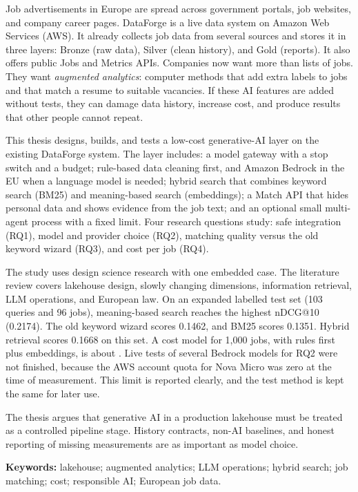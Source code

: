 Job advertisements in Europe are spread across government portals, job websites, and company career pages. DataForge is a live data system on Amazon Web Services (AWS). It already collects job data from several sources and stores it in three layers: Bronze (raw data), Silver (clean history), and Gold (reports). It also offers public Jobs and Metrics APIs. Companies now want more than lists of jobs. They want \emph{augmented analytics}: computer methods that add extra labels to jobs and that match a resume to suitable vacancies. If these AI features are added without tests, they can damage data history, increase cost, and produce results that other people cannot repeat.

This thesis designs, builds, and tests a low-cost generative-AI layer on the existing DataForge system. The layer includes: a model gateway with a stop switch and a budget; rule-based data cleaning first, and Amazon Bedrock in the EU when a language model is needed; hybrid search that combines keyword search (BM25) and meaning-based search (embeddings); a Match API that hides personal data and shows evidence from the job text; and an optional small multi-agent process with a fixed limit. Four research questions study: safe integration (RQ1), model and provider choice (RQ2), matching quality versus the old keyword wizard (RQ3), and cost per job (RQ4).

The study uses design science research with one embedded case. The literature review covers lakehouse design, slowly changing dimensions, information retrieval, LLM operations, and European law. On an expanded labelled test set (103 queries and 96 jobs), meaning-based search reaches the highest nDCG@10 (0.2174). The old keyword wizard scores 0.1462, and BM25 scores 0.1351. Hybrid retrieval scores 0.1668 on this set. A cost model for 1{,}000 jobs, with rules first plus embeddings, is about . Live tests of several Bedrock models for RQ2 were not finished, because the AWS account quota for Nova Micro was zero at the time of measurement. This limit is reported clearly, and the test method is kept the same for later use.

The thesis argues that generative AI in a production lakehouse must be treated as a controlled pipeline stage. History contracts, non-AI baselines, and honest reporting of missing measurements are as important as model choice.

\vspace{0.8em}
\noindent\textbf{Keywords:} lakehouse; augmented analytics; LLM operations; hybrid search; job matching; cost; responsible AI; European job data.
